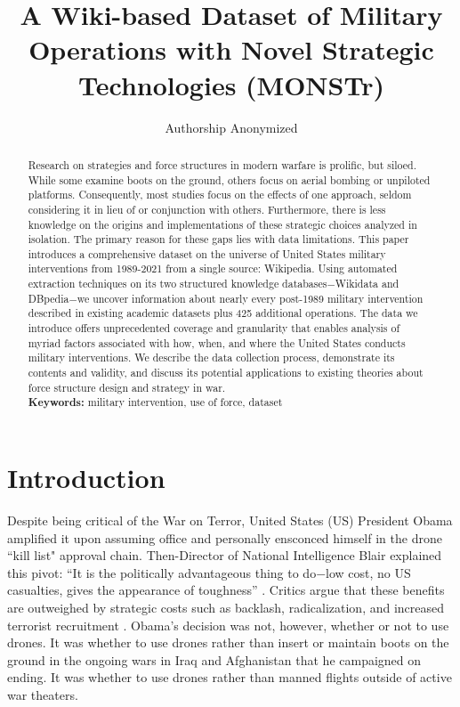 \documentclass[fleqn,12pt]{article}
\title{\singlespacing A Wiki-based Dataset of Military Operations with Novel Strategic Technologies (MONSTr)}
\author{Authorship Anonymized}
\date{}
\begin{document}
	\maketitle
	\thispagestyle{empty}
	\setcounter{page}{0}
	
	\begin{abstract}
            \singlespacing \noindent Research on strategies and force structures in modern warfare is prolific, but siloed. While some examine boots on the ground, others focus on aerial bombing or unpiloted platforms. Consequently, most studies focus on the effects of one approach, seldom considering it in lieu of or conjunction with others. Furthermore, there is less knowledge on the origins and implementations of these strategic choices analyzed in isolation. The primary reason for these gaps lies with data limitations. This paper introduces a comprehensive dataset on the universe of United States military interventions from 1989-2021 from a single source: Wikipedia. Using automated extraction techniques on its two structured knowledge databases$-$Wikidata and DBpedia$-$we uncover information about nearly every post-1989 military intervention described in existing academic datasets plus 425 additional operations. The data we introduce offers unprecedented coverage and granularity that enables analysis of myriad factors associated with how, when, and where the United States conducts military interventions. We describe the data collection process, demonstrate its contents and validity, and discuss its potential applications to existing theories about force structure design and strategy in war.\\
		\vspace{.1in}
		\noindent
		\textbf{Keywords:} military intervention, use of force, dataset
	\end{abstract}
	
\newpage
\noindent

\section*{Introduction}
Despite being critical of the War on Terror, United States (US) President Obama amplified it upon assuming office and personally ensconced himself in the drone ``kill list" approval chain. Then-Director of National Intelligence Blair explained this pivot: ``It is the politically advantageous thing to do$-$low cost, no US casualties, gives the appearance of toughness” \citep{becker_secretkilllist_2012}. Critics argue that these benefits are outweighed by strategic costs such as backlash, radicalization, and increased terrorist recruitment \citep{kilcullen_opiniondeathoutrage_2009}. Obama's decision was not, however, whether or not to use drones. It was whether to use drones rather than insert or maintain boots on the ground in the ongoing wars in Iraq and Afghanistan that he campaigned on ending. It was whether to use drones rather than manned flights outside of active war theaters.
	
\end{document}
